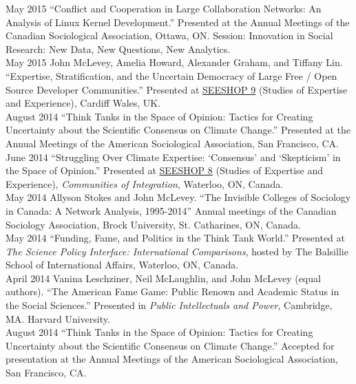 \documentclass[9pt,usenames,dvipsnames]{article}
\begin{document}
\ind May 2015 ``Conflict and Cooperation in Large Collaboration Networks: An Analysis of Linux Kernel Development.'' Presented at the Annual Meetings of the Canadian Sociological Association, Ottawa, ON. Session: Innovation in Social Research: New Data, New Questions, New Analytics.\\

\ind May 2015 John McLevey, Amelia Howard, Alexander Graham, and Tiffany Lin. ``Expertise, Stratification, and the Uncertain Democracy of Large Free / Open Source Developer Communities.'' Presented at \href{http://www.cf.ac.uk/socsi/contactsandpeople/harrycollins/expertise-project/seeshophome.html}{SEESHOP 9} (Studies of Expertise and Experience), Cardiff Wales, UK. \\

\ind August 2014 ``Think Tanks in the Space of Opinion: Tactics for Creating Uncertainty about the Scientific Consensus on Climate Change.'' Presented at the Annual Meetings of the American Sociological Association, San Francisco, CA. \\

\ind June 2014 ``Struggling Over Climate Expertise: `Consensus' and `Skepticism' in the Space of Opinion.'' Presented at \href{http://www.cf.ac.uk/socsi/contactsandpeople/harrycollins/expertise-project/seeshophome.html}{SEESHOP 8} (Studies of Expertise and Experience), \emph{Communities of Integration}, Waterloo, ON, Canada. \\

\ind May 2014 Allyson Stokes and John McLevey. ``The Invisible Colleges of Sociology in Canada: A Network Analysis, 1995-2014'' Annual meetings of the Canadian Sociology Association, Brock University, St. Catharines, ON, Canada.\\

\ind May 2014 ``Funding, Fame, and Politics in the Think Tank World.'' Presented at \emph{The Science Policy Interface: International Comparisons}, hosted by The Balsillie School of International Affairs, Waterloo, ON, Canada. \\

\ind April 2014 Vanina Leschziner, Neil McLaughlin, and John McLevey (equal authors). ``The American Fame Game: Public Renown and Academic Status in the Social Sciences.'' Presented in \emph{Public Intellectuals and Power}, Cambridge, MA. Harvard University. \\

\ind August 2014 ``Think Tanks in the Space of Opinion: Tactics for Creating Uncertainty about the Scientific Consensus on Climate Change.'' Accepted for presentation at the Annual Meetings of the American Sociological Association, San Francisco, CA. \\
\end{document}

